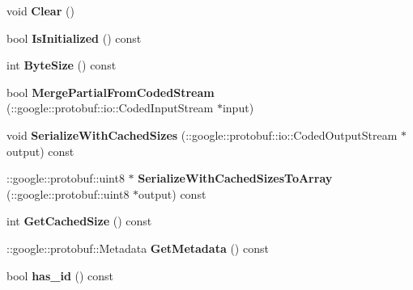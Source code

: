 \begin{DoxyCompactItemize}
\item 
\hypertarget{classgraph_1_1Graph__Edge_a2bbcc59dbf4e00c8f3007fa89b5470a9}{
void {\bfseries Clear} ()}
\label{classgraph_1_1Graph__Edge_a2bbcc59dbf4e00c8f3007fa89b5470a9}

\item 
\hypertarget{classgraph_1_1Graph__Edge_a9d94dfbfe951e8e834ccf837901c51dd}{
bool {\bfseries IsInitialized} () const }
\label{classgraph_1_1Graph__Edge_a9d94dfbfe951e8e834ccf837901c51dd}

\item 
\hypertarget{classgraph_1_1Graph__Edge_a76a24bfd2a4d0f0f79df2014bb4d184d}{
int {\bfseries ByteSize} () const }
\label{classgraph_1_1Graph__Edge_a76a24bfd2a4d0f0f79df2014bb4d184d}

\item 
\hypertarget{classgraph_1_1Graph__Edge_aed892b9333d734dde9a338fafa4ea497}{
bool {\bfseries MergePartialFromCodedStream} (::google::protobuf::io::CodedInputStream $\ast$input)}
\label{classgraph_1_1Graph__Edge_aed892b9333d734dde9a338fafa4ea497}

\item 
\hypertarget{classgraph_1_1Graph__Edge_a0f0582860901bfb055dda63c7193e7e3}{
void {\bfseries SerializeWithCachedSizes} (::google::protobuf::io::CodedOutputStream $\ast$output) const }
\label{classgraph_1_1Graph__Edge_a0f0582860901bfb055dda63c7193e7e3}

\item 
\hypertarget{classgraph_1_1Graph__Edge_a864e056928fefb48751ba22f97064d3f}{
::google::protobuf::uint8 $\ast$ {\bfseries SerializeWithCachedSizesToArray} (::google::protobuf::uint8 $\ast$output) const }
\label{classgraph_1_1Graph__Edge_a864e056928fefb48751ba22f97064d3f}

\item 
\hypertarget{classgraph_1_1Graph__Edge_aeb53e0cc707fcb6d3e329541b293d919}{
int {\bfseries GetCachedSize} () const }
\label{classgraph_1_1Graph__Edge_aeb53e0cc707fcb6d3e329541b293d919}

\item 
\hypertarget{classgraph_1_1Graph__Edge_a323a96197c86ad300ddf7f63cda021b7}{
::google::protobuf::Metadata {\bfseries GetMetadata} () const }
\label{classgraph_1_1Graph__Edge_a323a96197c86ad300ddf7f63cda021b7}

\item 
\hypertarget{classgraph_1_1Graph__Edge_a0190e8f222646d5e304732d71d28b310}{
bool {\bfseries has\_\-id} () const }
\label{classgraph_1_1Graph__Edge_a0190e8f222646d5e304732d71d28b310}


\end{DoxyCompactItemize}
